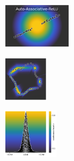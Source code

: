 \begin{figure}[H]
    \centering
    \begin{subfigure}
        \centering
        \includegraphics[width=0.388\textwidth,valign=t]{ood-detection/figures/ood-detection/confidence-line-aa-relu.pdf}
    \end{subfigure}
    \begin{subfigure}
        \centering
        \includegraphics[width=0.254\textwidth,valign=t]{ood-detection/figures/ood-detection/confidence-circle-aa-relu.pdf}
    \end{subfigure}
    \begin{subfigure}
        \centering
        \includegraphics[width=0.308\textwidth,valign=t]{ood-detection/figures/ood-detection/confidence-haystack-aa-relu.pdf}
    \end{subfigure}


\end{figure}
